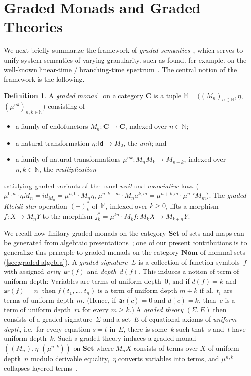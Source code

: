 \documentclass[11pt,a4paper]{amsart}
\newcommand{\ar}{\mathsf{ar}}
\newcommand{\Id}{\mathsf{Id}}
\theoremstyle{plain}
\newcommand{\id}{\mathit{id}}
\numberwithin{equation}{section}
\newcommand{\Nat}{{\mathbb{N}}}
\newcommand{\monad}{{\mathbb{M}}}
\newcommand{\Set}{\mathbf{Set}}
\newcommand{\+}[1]{\mathcal{#1}\xspace}
\newcommand{\Nom}{\mathbf{Nom}}
\newcommand{\BC}{\mathbf{C}}
\theoremstyle{definition}
\newtheorem{defn}[defn]{Definition}
\begin{document}
\section{Graded Monads and Graded Theories}\label{sec:graded-monads}

\noindent We next briefly summarize the framework of \emph{graded
  semantics}~\cite{MiliusEA15,DorschEA19}, which serves to unify
system semantics of varying granularity, such as found, for example,
on the well-known linear-time / branching-time
spectrum~\cite{Glabbeek90}. The central notion of the framework is the
following.

\begin{defn}\label{def:graded-monad}
  A \emph{graded monad}~\cite{Smirnov08} on a category \(\BC\) is a
  tuple $\monad=((M_n)_{n \in \Nat}, \eta,$
  $(\mu^{nk})_{n, k \in \Nat})$ consisting of
    \begin{itemize}
    \item a family of endofunctors \(M_n\colon \BC \to \BC\), indexed over
      \(n \in \Nat\);
    \item a natural transformation \(\eta: \Id \to M_0\), the
      \emph{unit}; and
    \item a family of natural transformations
      \(\mu^{nk}: M_n M_k \to M_{n + k}\), indexed over
      \(n, k \in \Nat\), the \emph{multiplication}
    \end{itemize}
    satisfying graded variants of the usual \emph{unit} and
    \emph{associative} laws
    ($\mu^{0,n} \cdot \eta M_n = \id_{M_n} = \mu^{n,0} \cdot M_n
    \eta$,
    $\mu^{n,k+m} \cdot M_n \mu^{k,m} = \mu^{n+k,m} \cdot \mu^{n,k}
    M_m$). The \emph{graded Kleisli star} operation $(-)_k^*$
    of~$\monad$, indexed over $k\ge 0$, lifts a morphism
    $f\colon X\to M_nY$ to the morphism
    $f_k^*=\mu^{kn}\cdot M_kf\colon M_kX\to M_{k+n}Y$.
  \end{defn}
  We recall how finitary graded monads on the category $\Set$ of sets
  and maps can be generated from algebraic
  presentations~\cite{Smirnov08,MiliusEA15}; one of our present
  contributions is to generalize this principle to graded monads on
  the category $\Nom$ of nominal sets (\cref{sec:graded-algebra}). A
  \emph{graded signature}~$\Sigma$ is a collection of function
  symbols~$f$ with assigned \emph{arity}~$\ar(f)$ and
  \emph{depth}~$d(f)$. This induces a notion of term of uniform depth:
  Variables are terms of uniform depth~\(0\), and if \(d(f) = k\) and
  $\ar(f)=n$, then \(f(t_1, \ldots, t_n)\) is a term of uniform depth
  \(m + k\) if all~\(t_i\) are terms of uniform depth~\(m\). (Hence,
  if~$\ar(c)=0$ and $d(c)=k$, then~$c$ is a term of uniform depth~$m$
  for every $m\ge k$.) A \emph{graded theory} $(\Sigma,E)$ then
  consists of a graded signature~$\Sigma$ and a set~\(E\) of
  equational axioms of \emph{uniform depth}, i.e.\ for every equation
  $s=t$ in~$E$, there is some~$k$ such that~$s$ and~$t$ have uniform
  depth~$k$. Such a graded theory induces a graded monad
  \(((M_n), \eta, (\mu^{n, k}))\) on $\Set$ where \(M_n X\) consists
  of terms over \(X\) of uniform depth~\(n\) modulo derivable
  equality,~\(\eta\) converts variables into terms, and \(\mu^{n, k}\)
  collapses layered terms~\cite{MiliusEA15}.
\end{document}
